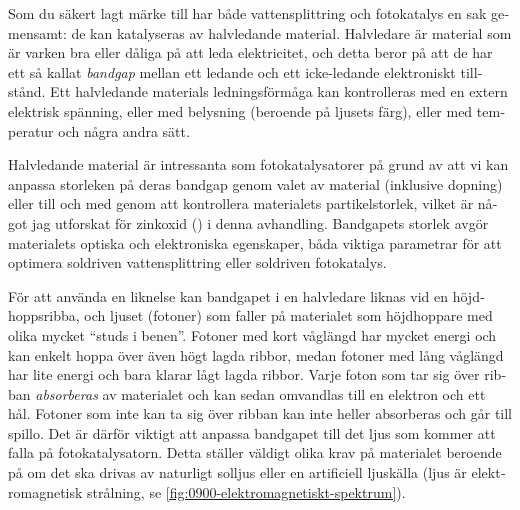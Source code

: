\documentclass[webedition,openright,titles,swedish,english]{LuaUUThesis}\usepackage[]{graphicx}\usepackage[]{xcolor}
\begin{document}
\begin{otherlanguage}{swedish}
Som du säkert lagt märke till har både vattensplittring och fotokatalys
en sak gemensamt: de kan katalyseras av halvledande material.
Halvledare är material som är varken bra eller dåliga på att leda
elektricitet, och detta beror på att de har ett så kallat \emph{bandgap}
mellan ett ledande och ett icke-ledande elektroniskt tillstånd.
Ett halvledande materials ledningsförmåga kan kontrolleras med en extern
elektrisk spänning, eller med belysning (beroende på ljusets färg), eller
med temperatur och några andra sätt.

Halvledande material är intressanta som fotokatalysatorer på grund av att vi kan
anpassa storleken på deras bandgap genom valet av material (inklusive dopning)
eller till och med genom att kontrollera materialets partikelstorlek, vilket är
något jag utforskat för zinkoxid (\ZnO) i denna avhandling.
Bandgapets storlek avgör materialets optiska och elektroniska egenskaper, båda
viktiga parametrar för att optimera soldriven vattensplittring
eller soldriven fotokatalys.

För att använda en liknelse kan bandgapet i en halvledare liknas vid en höjdhoppsribba,
och ljuset (fotoner) som faller på materialet som höjdhoppare med olika mycket \enquote{studs i benen}.
Fotoner med kort våglängd har mycket energi och kan enkelt hoppa över även högt lagda ribbor,
medan fotoner med lång våglängd har lite energi och bara klarar lågt lagda ribbor.
Varje foton som tar sig över ribban \emph{absorberas} av materialet och kan sedan
omvandlas till en elektron och ett hål.
Fotoner som inte kan ta sig över ribban kan inte heller absorberas och går till spillo.
Det är därför viktigt att anpassa bandgapet till det ljus som kommer att falla
på fotokatalysatorn. Detta ställer väldigt olika krav på materialet beroende
på om det ska drivas av naturligt solljus eller en artificiell ljuskälla
(ljus är elektromagnetisk strålning, se \cref{fig:0900-elektromagnetiskt-spektrum}).

%


\begin{figure}[tbp]
\centering


%


\end{figure}
\end{otherlanguage}
\end{document}
